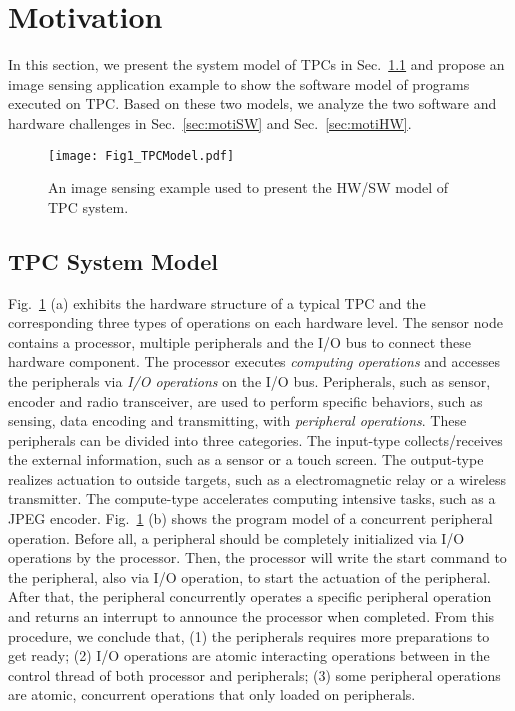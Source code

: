 \section{Motivation} \label{sec:motivation}
%
In this section, we present the system model of TPCs in Sec.~\ref{sec:motiModel} and propose an image sensing application example to show the software model of programs executed on TPC.
Based on these two models, we analyze the two software and hardware challenges in Sec.~\ref{sec:motiSW} and Sec.~\ref{sec:motiHW}. 

%
\begin{figure}[t]
    \centering
    \texttt{[image: Fig1\_TPCModel.pdf]}
    \caption{An image sensing example used to present the HW/SW model of TPC system.}
    \label{fig:TPCmodel}
\end{figure}

\subsection{TPC System Model} \label{sec:motiModel}
%
Fig.~\ref{fig:TPCmodel} (a) exhibits the hardware structure of a typical TPC and the corresponding three types of operations on each hardware level. 
The sensor node contains a processor, multiple peripherals and the I/O bus to connect these hardware component.
The processor executes \emph{computing operations} and accesses the peripherals via \emph{I/O operations} on the I/O bus.
Peripherals, such as sensor, encoder and radio transceiver, are used to perform specific behaviors, such as sensing, data encoding and transmitting, with \emph{peripheral operations}.
These peripherals can be divided into three categories.
The input-type collects/receives the external information, such as a sensor or a touch screen.
The output-type realizes actuation to outside targets, such as a electromagnetic relay or a wireless transmitter.
The compute-type accelerates computing intensive tasks, such as a JPEG encoder.
Fig.~\ref{fig:TPCmodel} (b) shows the program model of a concurrent peripheral operation.
Before all, a peripheral should be completely initialized via I/O operations by the processor.
Then, the processor will write the start command to the peripheral, also via I/O operation, to start the actuation of the peripheral.
After that, the peripheral concurrently operates a specific peripheral operation and returns an interrupt to announce the processor when completed.
From this procedure, we conclude that, (1) the peripherals requires more preparations to get ready; (2) I/O operations are atomic interacting operations between in the control thread of both processor and peripherals; (3) some peripheral operations are atomic, concurrent operations that only loaded on peripherals.

